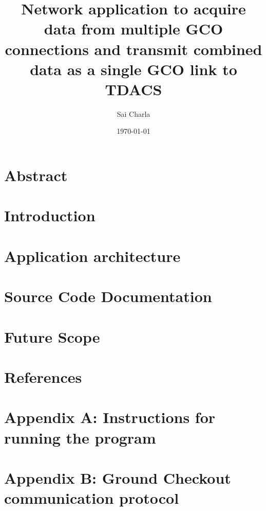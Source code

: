 \documentclass[12pt, a4paper]{report}
\title{Network application to acquire data from multiple GCO connections and
	   transmit combined data as a single GCO link to TDACS}
\author{Sai Charla}
\date{\today}
\begin{document}
\maketitle
\tableofcontents
\section{Abstract}
\section{Introduction}
\section{Application architecture}
\section{Source Code Documentation}
\section{Future Scope}
\section{References}
\section{Appendix A: Instructions for running the program}
\section{Appendix B: Ground Checkout communication protocol}
\end{document}
